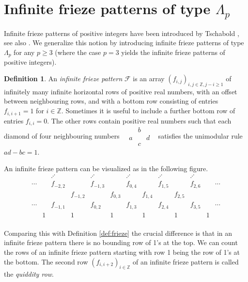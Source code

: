 \documentclass[11pt,a4paper]{amsart}
\theoremstyle{definition}
\newtheorem{Definition}[Lemma]{Definition}
\numberwithin{equation}{section}
\begin{document}
\section{Infinite frieze patterns of type $\Lambda_p$}
\label{sec:infiniteLambdap}

Infinite frieze patterns of positive integers have been introduced by Tschabold \cite{T15}, see
also \cite{BPT16}. We generalize this notion by introducing infinite frieze patterns of
type $\Lambda_p$ for any $p\ge 3$ (where the case $p=3$ yields the infinite frieze patterns of
positive integers). 



\begin{Definition} \label{def:infinitefrieze}
An {\em infinite frieze pattern} $\mathcal{F}$ is an array $(f_{i,j})_{i,j\in \mathbb{Z}, j - i\ge 1}$
of infinitely many infinite horizontal rows of positive real numbers, with an
offset between neighbouring rows, and with a bottom row consisting of entries
$f_{i,i+1}=1$ for $i\in \mathbb{Z}$. Sometimes it is useful to include a further bottom row of entries $f_{i,i}=0$.
The other rows contain
positive real numbers such that each diamond of four neighbouring numbers\,\,\,\,
$\begin{matrix} & b & \\ a & & d \\ & c & \end{matrix}$\,\,\,
satisfies the unimodular rule $ad-bc=1$. 


\end{Definition}

An infinite frieze pattern can be visualized as in the following figure.
$$\begin{array}{ccccccccccccc}
& & \iddots & & \iddots & & \iddots & & \iddots & & \iddots & & \\
\cdots & & f_{-2,2} & & f_{-1,3} & & f_{0,4} & & f_{1,5} & & f_{2,6} & & \cdots \\
& & & f_{-1,2} & & f_{0,3} & & f_{1,4} & & f_{2,5} & & & \\
\cdots & & f_{-1,1} & & f_{0,2} & & f_{1,3} & & f_{2,4} & & f_{3,5} &  & \cdots \\
  & 1 & & 1 & & 1 & & 1 & & 1 & & 1 & \\
 \end{array}
$$

Comparing this with Definition \ref{def:frieze} the crucial difference is that in an infinite frieze pattern
there is no bounding row of 1's at the top. 
We can count the rows of an infinite frieze pattern starting with row 1 being the row of 1's at the bottom.
The second row $(f_{i,i+2})_{i\in \mathbb{Z}}$ of an infinite frieze pattern is called the {\em quiddity row}. 
\smallskip
\end{document}
